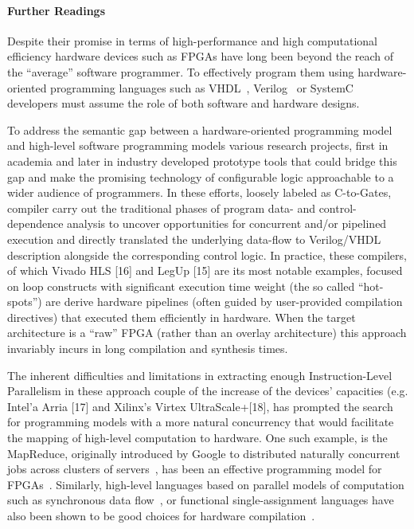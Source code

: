 \paragraph{Further Readings}
Despite their promise in terms of high-performance and high computational efficiency  hardware devices such as FPGAs have long been beyond the reach of the ``average'' software programmer. To effectively program them using hardware-oriented programming languages such as  VHDL~\cite{VHDLBook}, Verilog~\cite{VerilogBook} or SystemC~\cite{SystemC:ISSS01} developers must assume the role of both software and hardware designs. 

To address the semantic gap between a hardware-oriented programming model and high-level software programming models various research projects, first in academia and later in industry developed prototype tools that could bridge this gap and make the promising technology of  configurable logic approachable to a wider audience of programmers.  In these efforts, loosely labeled as C-to-Gates, compiler carry out the traditional phases of program data- and control-dependence analysis to uncover opportunities for concurrent and/or pipelined execution and directly translated the underlying data-flow to Verilog/VHDL description alongside the corresponding control logic.   In practice, these compilers, of which Vivado HLS [16] and LegUp [15] are its most notable examples, focused on loop constructs with significant execution time weight (the so called ``hot-spots'') are derive hardware pipelines (often guided by user-provided compilation directives) that executed them efficiently in hardware. When the target architecture is a ``raw'' FPGA (rather than an overlay architecture) this approach invariably incurs in long compilation and synthesis times.

The inherent difficulties and limitations in extracting enough Instruction-Level Parallelism in these approach couple of the increase of the devices' capacities (e.g. Intel'a Arria [17] and Xilinx's Virtex UltraScale+[18], has prompted the search for programming models with a more natural concurrency that would facilitate the mapping of high-level computation to hardware. One such example, is the MapReduce, originally introduced by Google to distributed naturally concurrent  
jobs across clusters of servers~\cite{Dean:CACM08}, has been an effective 
programming model for FPGAs~\cite{Yeung:FCCM08}. Similarly, high-level 
languages based on parallel models of computation such as synchronous data 
flow~\cite{Lee:ProcIEEE87}, or functional single-assignment languages have 
also been shown to be good choices for hardware  compilation~\cite{Hormati:CASES08,Hagiescu:DAC09,SAC:IJS02}.


